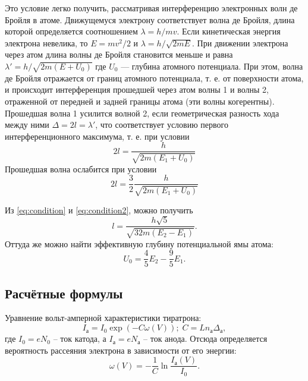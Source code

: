 \documentclass[a4paper]{article}
\begin{document}
Это условие легко получить, рассматривая интерференцию электронных волн де Бройля в атоме. Движущемуся электрону соответствует волна де Бройля, длина которой определяется соотношением $ \lambda = h/m v $. Если кинетическая энергия электрона невелика, то $ E = m v^2/2 $ и $ \lambda = h/\sqrt{2 m E} $. При движении электрона через атом длина волны де Бройля становится меньше и равна $ \lambda' = h/\sqrt{2 m (E+U_0)} $ где $ U_0 $ — глубина атомного потенциала. При этом, волна де Бройля отражается от границ атомного потенциала, т. е. от поверхности атома, и происходит интерференция прошедшей через атом волны 1 и волны 2, отраженной от передней и задней границы атома (эти волны когерентны). Прошедшая волна 1 усилится волной 2, если геометрическая разность хода между ними $ \Delta = 2 l = \lambda' $, что соответствует условию первого интерференционного максимума, т. е. при условии
\begin{equation}\label{eq:condition}
	2 l = \frac{h}{\sqrt{2 m (E_1 + U_0)}}
\end{equation}
Прошедшая волна ослабится при условии
\begin{equation}\label{eq:condition2}
	2 l = \frac{3}{2}\frac{h}{\sqrt{2 m (E_1 + U_0)}}
\end{equation}

Из \eqref{eq:condition} и \eqref{eq:condition2}, можно получить
\begin{equation}\label{eq:radius}
	l = \frac{h \sqrt{5}}{\sqrt{32 m (E_2-E_1)}}.
\end{equation}
Оттуда же можно найти эффективную глубину потенциальной ямы атома:
\begin{equation}\label{eq:atomPit}
	U_0 = \frac{4}{5}E_2-\frac{9}{5} E_1.
\end{equation}

\subsection{Расчётные формулы}

Уравнение вольт-амперной характеристики тиратрона:
\begin{equation}\label{eq:VAH}
	I_а = I_0 \exp (-C \omega (V));\; C = L n_а \Delta_а,
\end{equation}
где $ I_0 = e N_0 $ -- ток катода, а $ I_а = e N_а $ -- ток анода.
Отсюда определяется вероятность рассеяния электрона в зависимости от его энергии:
\begin{equation}\label{eq:probable}
	\omega (V) = -\frac{1}{C} \ln \frac{I_а(V)}{I_0}.
\end{equation}
\end{document}
